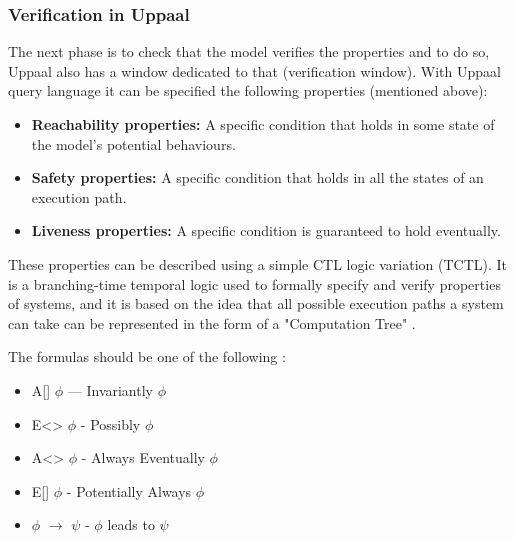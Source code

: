 \subsubsection*{Verification in Uppaal}

The next phase is to check that the model verifies the properties and to do so, Uppaal also has a window dedicated to that (verification window). With Uppaal query language it can be specified the following properties (mentioned above):

\begin{itemize}
    \item \textbf{Reachability properties:} A specific condition that holds in some state of the model’s potential behaviours.

    \item \textbf{Safety properties:} A specific condition that holds in all the states of an execution path.

    \item \textbf{Liveness properties:} A specific condition is guaranteed to hold eventually.

\end{itemize}

These properties can be described using a simple CTL logic variation (TCTL)\cite{lee2009timed}. It is a branching-time temporal logic used to formally specify and verify properties of systems, and it is based on the idea that all possible execution paths a system can take can be represented in the form of a "Computation Tree" \cite{lee2009timed}.

The formulas should be one of the following \cite{bengtsson2004timed}:

\begin{itemize}
    \item A[] $\phi$ — Invariantly $\phi$

    \item E<> $\phi$ - Possibly $\phi$

    \item A<> $\phi$ - Always Eventually $\phi$

    \item E[] $\phi$ - Potentially Always $\phi$

    \item $\phi$ $\longrightarrow$ $\psi$ - $\phi$ leads to $\psi$
    
\end{itemize}

